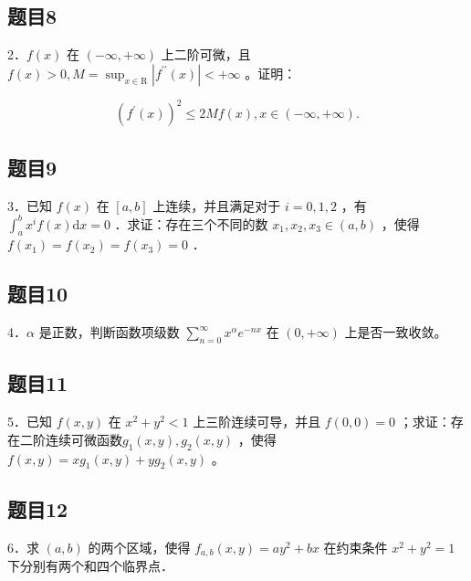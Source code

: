 \documentclass{article}
\begin{document}
\subsection{题目8}
2．\(f(x)\) 在 \((-\infty,+\infty)\) 上二阶可微，且 \(f(x)>0, M=\sup _{x \in \mathrm{R}}\left|f^{\prime \prime}(x)\right|<+\infty\) 。证明：

\[
\left(f^{\prime}(x)\right)^{2} \leq 2 M f(x), x \in(-\infty,+\infty) .
\]

\subsection{题目9}
3．已知 \(f(x)\) 在 \([a, b]\) 上连续，并且满足对于 \(i=0,1,2\) ，有 \(\int_{a}^{b} x^{i} f(x) \mathrm{d} x=0\) ．求证：存在三个不同的数 \(x_{1}, x_{2}, x_{3} \in(a, b)\) ，使得 \(f\left(x_{1}\right)=f\left(x_{2}\right)=f\left(x_{3}\right)=0\) ．

\subsection{题目10}
4．\(\alpha\) 是正数，判断函数项级数 \(\sum_{n=0}^{\infty} x^{\alpha} e^{-n x}\) 在 \((0,+\infty)\) 上是否一致收敛。

\subsection{题目11}
5．已知 \(f(x, y)\) 在 \(x^{2}+y^{2}<1\) 上三阶连续可导，并且 \(f(0,0)=0\) ；求证：存在二阶连续可微函数\(g_{1}(x, y), g_{2}(x, y)\) ，使得 \(f(x, y)=x g_{1}(x, y)+y g_{2}(x, y)\) 。

\subsection{题目12}
6．求 \((a, b)\) 的两个区域，使得 \(f_{a, b}(x, y)=a y^{2}+b x\) 在约束条件 \(x^{2}+y^{2}=1\) 下分别有两个和四个临界点．
\end{document}
